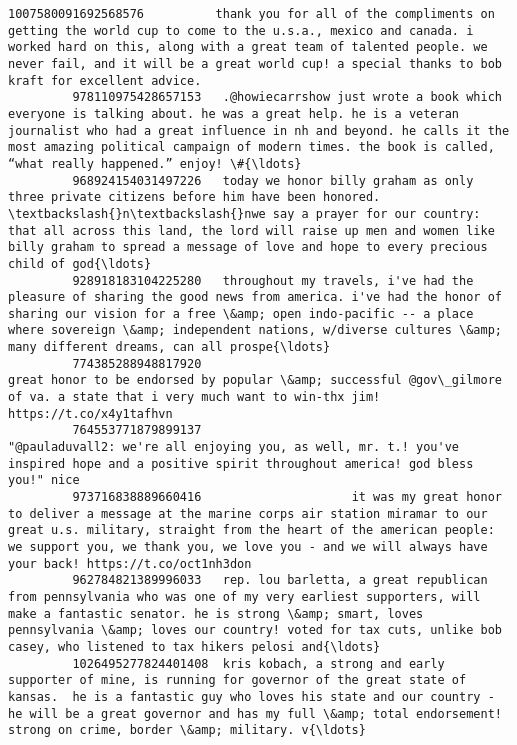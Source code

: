 \documentclass[11pt]{article}
\begin{document}
\begin{Verbatim}[commandchars=\\\{\}]
         1007580091692568576          thank you for all of the compliments on getting the world cup to come to the u.s.a., mexico and canada. i worked hard on this, along with a great team of talented people. we never fail, and it will be a great world cup! a special thanks to bob kraft for excellent advice.   
         978110975428657153   .@howiecarrshow just wrote a book which everyone is talking about. he was a great help. he is a veteran journalist who had a great influence in nh and beyond. he calls it the most amazing political campaign of modern times. the book is called, “what really happened.” enjoy! \#{\ldots}   
         968924154031497226   today we honor billy graham as only three private citizens before him have been honored. \textbackslash{}n\textbackslash{}nwe say a prayer for our country: that all across this land, the lord will raise up men and women like billy graham to spread a message of love and hope to every precious child of god{\ldots}   
         928918183104225280   throughout my travels, i've had the pleasure of sharing the good news from america. i've had the honor of sharing our vision for a free \&amp; open indo-pacific -- a place where sovereign \&amp; independent nations, w/diverse cultures \&amp; many different dreams, can all prospe{\ldots}   
         774385288948817920                                                                                                                                          great honor to be endorsed by popular \&amp; successful @gov\_gilmore of va. a state that i very much want to win-thx jim! https://t.co/x4y1tafhvn   
         764553771879899137                                                                                                                                              "@pauladuvall2: we're all enjoying you, as well, mr. t.! you've inspired hope and a positive spirit throughout america! god bless you!" nice   
         973716838889660416                     it was my great honor to deliver a message at the marine corps air station miramar to our great u.s. military, straight from the heart of the american people: we support you, we thank you, we love you - and we will always have your back! https://t.co/oct1nh3don   
         962784821389996033   rep. lou barletta, a great republican from pennsylvania who was one of my very earliest supporters, will make a fantastic senator. he is strong \&amp; smart, loves pennsylvania \&amp; loves our country! voted for tax cuts, unlike bob casey, who listened to tax hikers pelosi and{\ldots}   
         1026495277824401408  kris kobach, a strong and early supporter of mine, is running for governor of the great state of kansas.  he is a fantastic guy who loves his state and our country - he will be a great governor and has my full \&amp; total endorsement! strong on crime, border \&amp; military. v{\ldots}   

\end{Verbatim}
\end{document}
